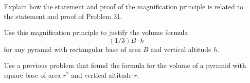 \documentclass[newpage,hints,handout]{ximera}
\begin{document}
\begin{problem}
 Explain how the statement and proof of the magnification principle is related to the statement and proof of Problem 31.
\end{problem}

\begin{problem}
Use this magnification principle to justify the volume formula%
\[
(1/3)B\cdot h
\]
for any pyramid with rectangular base of area $B$ and vertical altitude $h$.
\begin{hint}
 Use a previous problem that found the formula for the volume of a pyramid with square base of area $r^2$ and vertical altitude $r$.
\end{hint}
\end{problem}




%
%
%
\end{document}
